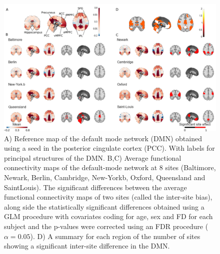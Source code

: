 \documentclass[authoryear]{elsarticle}
\begin{document}
\begin{figure}[tbp]
\begin{center}
\includegraphics[width=\linewidth]{../figures/dmn_multisite.png}
\end{center}
\caption[DMN variability across sites]{
A) Reference map of the default mode network (DMN) obtained using a seed in the posterior cingulate cortex (PCC). With labels for principal structures of the DMN.
B,C) Average functional connectivity maps of the default-mode network at 8 sites (Baltimore, Newark, Berlin, Cambridge, New-Yorkb, Oxford, Queensland and SaintLouis). The significant differences between the average functional connectivity maps of two sites (called the inter-site bias), along side the statistically significant  differences obtained using a GLM procedure with covariates coding for age, sex and FD for each subject and the p-values were corrected using an FDR procedure ($\alpha=0.05$).
D) A summary for each region of the number of sites showing a significant inter-site difference in the DMN.
}
\label{fig_DMN_variability}
\end{figure}
\end{document}
